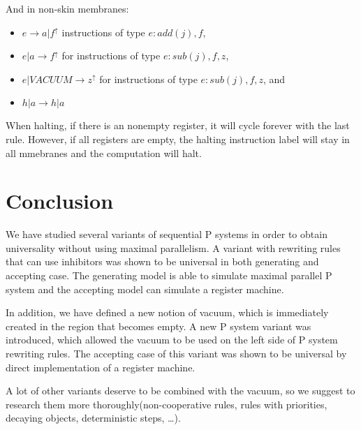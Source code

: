 \documentclass[a4paper,10pt]{article}
\begin{document}
\begin{dokaz}
  And in non-skin membranes:
  
  \begin{itemize}
	\item $e \rightarrow a|f^{\uparrow}$ instructions of type $e : add(j), f$,
	\item $e|a \rightarrow f^{\uparrow}$ for instructions of type $e : sub(j), f, z$,
	\item $e|VACUUM \rightarrow z^{\uparrow}$ for instructions of type $e : sub(j), f, z$, and
	\item $h|a \rightarrow h|a$
  \end{itemize}

  When halting, if there is an nonempty register, it will cycle forever with the last rule. However, if all registers are empty, the halting instruction label will stay in all mmebranes and the computation will halt.
  
\end{dokaz}

\section{Conclusion}
\label{sec:conclusion}
We have studied several variants of sequential P systems in order to obtain universality without using maximal parallelism.
A variant with rewriting rules that can use inhibitors was shown to be universal in both generating and accepting case. The generating model is able to simulate maximal parallel P system and the accepting model can simulate a register machine.

In addition, we have defined a new notion of vacuum, which is immediately created in the region that becomes empty. A new P system variant was introduced, which allowed the vacuum to be used on the left side of P system rewriting rules. The accepting case of this variant was shown to be universal by direct implementation of a register machine.

A lot of other variants deserve to be combined with the vacuum, so we suggest to research them more thoroughly(non-cooperative rules, rules with priorities, decaying objects, deterministic steps, \dots).


\end{document}
